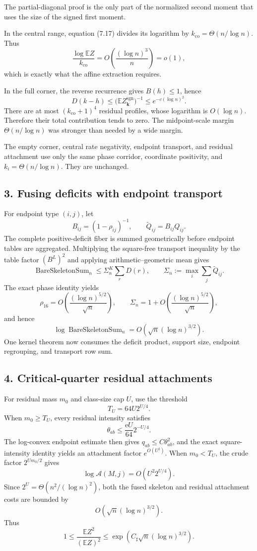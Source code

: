 The partial-diagonal proof is the only part of the normalized second moment
that uses the size of the signed first moment.

In the central range, equation (7.17) divides its logarithm by
$k_{\mathrm{co}}=\Theta(n/\log n)$. Thus
\[
  \frac{\log\mathbb E Z}{k_{\mathrm{co}}}
  =O\!\left(\frac{(\log n)^3}{n}\right)=o(1),
\]
which is exactly what the affine extraction requires.

In the full corner, the reverse recurrence gives $B(h)\le1$, hence
\[
  D(k-h)
  \le
  \bigl(\mathbb E Z_{\mathbf k}^{\mathrm{sgn}}\bigr)^{-1}
  \le e^{-c(\log n)^2}.
\]
There are at most $(k_{\mathrm{co}}+1)^4$ residual profiles, whose logarithm
is $O(\log n)$. Therefore their total contribution tends to zero. The
midpoint-scale margin $\Theta(n/\log n)$ was stronger than needed by a wide
margin.

The empty corner, central rate negativity, endpoint transport, and residual
attachment use only the same phase corridor, coordinate positivity, and
$k_i=\Theta(n/\log n)$. They are unchanged.

\subsection*{3. Fusing deficits with endpoint transport}

For endpoint type $(i,j)$, let
\[
  B_{ij}=(1-\rho_{ij})^{-1},
  \qquad
  \widetilde Q_{ij}=B_{ij}Q_{ij}.
\]
The complete positive-deficit fiber is summed geometrically before endpoint
tables are aggregated. Multiplying the square-free transport inequality by the
table factor $(B^L)^2$ and applying arithmetic--geometric mean gives
\[
  \operatorname{BareSkeletonSum}_n
  \le
  \Sigma_n^K\sum_rD(r),
  \qquad
  \Sigma_n:=\max_i\sum_j\widetilde Q_{ij}.
\]
The exact phase identity yields
\[
  \rho_{16}=O\!\left(\frac{(\log n)^{5/2}}{\sqrt n}\right),
  \qquad
  \Sigma_n=1+O\!\left(\frac{(\log n)^{5/2}}{\sqrt n}\right),
\]
and hence
\[
  \log\operatorname{BareSkeletonSum}_n
  =O\!\left(\sqrt n(\log n)^{3/2}\right).
\]
One kernel theorem now consumes the deficit product, support size, endpoint
regrouping, and transport row sum.

\subsection*{4. Critical-quarter residual attachments}

For residual mass $m_0$ and class-size cap $U$, use the threshold
\[
  T_U=64U2^{U/4}.
\]
When $m_0\ge T_U$, every residual intensity satisfies
\[
  \theta_{ab}
  \le\frac{\mathrm eU}{64}2^{-U/4}.
\]
The log-convex endpoint estimate then gives
$q_{ab}\le C\theta_{ab}^2$, and the exact square-intensity identity yields an
attachment factor $e^{O(U^2)}$. When $m_0<T_U$, the crude factor
$2^{Um_0/2}$ gives
\[
  \log\mathcal A(M,j)
  =O(U^2 2^{U/4}).
\]
Since $2^U=\Theta(n^2/(\log n)^2)$, both the fused skeleton and residual
attachment costs are bounded by
\[
  O\!\left(\sqrt n(\log n)^{3/2}\right).
\]
Thus
\[
  1
  \le
  \frac{\mathbb E Z^2}{(\mathbb E Z)^2}
  \le
  \exp\!\left(C_\sharp\sqrt n(\log n)^{3/2}\right).
\]

